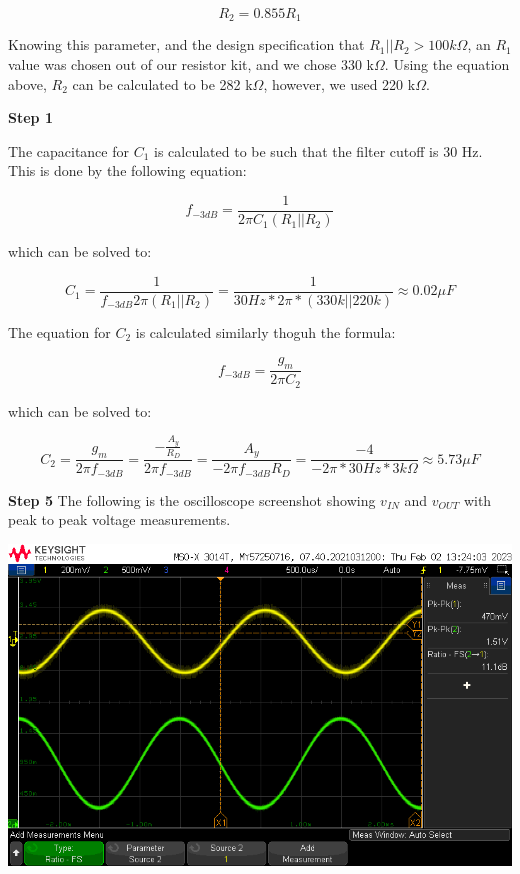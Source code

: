 \documentclass[notitlepage, 12pt]{report}  %
\begin{document}
\begin{equation}
    R_2 = 0.855 R_1
\end{equation}

Knowing this parameter, and the design specification that $R_1 || R_2 > 100 k\Omega$, an $R_1$ value was chosen out of our 
resistor kit, and we chose 330 k$\Omega$. Using the equation above, $R_2$ can be calculated to be 282 k$\Omega$, however, we 
used 220 k$\Omega$. \\

\newpage

\textbf{Step 1}

The capacitance for $C_1$ is calculated to be such that the filter cutoff is 30 Hz.
This is done by the following equation:

\begin{equation}
    f_{-3 dB} = \frac{1}{2\pi C_1 (R_1 || R_2)}
\end{equation}

which can be solved to:

\begin{equation}
    C_1 = \frac{1}{f_{-3 dB} 2\pi (R_1 || R_2)} = \frac{1}{30 Hz * 2\pi * (330k || 220k)} \approx 0.02 \mu F
\end{equation}

The equation for $C_2$ is calculated similarly thoguh the formula:

\begin{equation}
    f_{-3 dB} = \frac{g_m}{2\pi C_2}
\end{equation}

which can be solved to:

\begin{equation}
    C_2 = \frac{g_m}{2\pi f_{-3 dB}} =  
    \frac{-\frac{A_y}{R_D}}{2\pi f_{-3 dB}} = 
    \frac{A_y}{-2\pi f_{-3 dB} R_D} =  
    \frac{-4}{-2\pi * 30 Hz * 3k\Omega} \approx 
    5.73 \mu F
\end{equation}

\textbf{Step 5}
The following is the oscilloscope screenshot showing $v_{IN}$ and $v_{OUT}$ with peak to peak voltage measurements. \\

\begin{center}
    \includegraphics[scale=0.45]{scopeshot.png}
\end{center}
\end{document}
